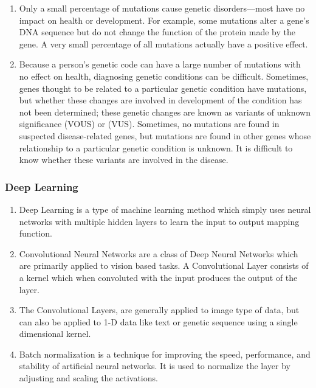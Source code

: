 \documentclass[twoside]{article}
\begin{document}
\begin{enumerate}
		\item Only a small percentage of mutations cause genetic disorders—most have no impact on health or development. For example, some mutations alter a gene's DNA sequence but do not change the function of the protein made by the gene. A very small percentage of all mutations actually have a positive effect.
		\item Because a person's genetic code can have a large number of mutations with no effect on health, diagnosing genetic conditions can be difficult. Sometimes, genes thought to be related to a particular genetic condition have mutations, but whether these changes are involved in development of the condition has not been determined; these genetic changes are known as variants of unknown significance (VOUS) or (VUS). Sometimes, no mutations are found in suspected disease-related genes, but mutations are found in other genes whose relationship to a particular genetic condition is unknown. It is difficult to know whether these variants are involved in the disease.
	\end{enumerate}
\pagebreak
	\subsubsection{Deep Learning}
	\begin{enumerate}
		\item Deep Learning is a type of machine learning method which simply uses neural networks with multiple hidden layers to learn the input to output mapping function.
		\item Convolutional Neural Networks are a class of Deep Neural Networks which are primarily applied to vision based tasks. A Convolutional Layer consists of a kernel which when convoluted with the input produces the output of the layer. 
		\item The Convolutional Layers, are generally applied to image type of data, but can also be applied to 1-D data like text or genetic sequence using a single dimensional kernel.
		\item Batch normalization is a technique for improving the speed, performance, and stability of artificial neural networks. It is used to normalize the layer by adjusting and scaling the activations.
	\end{enumerate}
	
	
	
\end{document}
